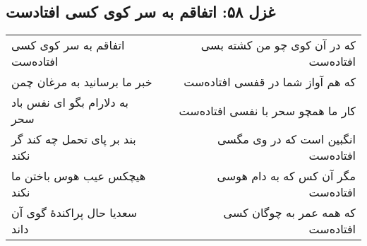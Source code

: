 \begin{center}
\section*{غزل ۵۸: اتفاقم به سر کوی کسی افتادست}
\label{sec:058}
\begin{longtable}{l p{0.5cm} r}
اتفاقم به سر کوی کسی افتاده‌ست
&&
که در آن کوی چو من کشته بسی افتاده‌ست
\\
خبر ما برسانید به مرغان چمن
&&
که هم آواز شما در قفسی افتاده‌ست
\\
به دلارام بگو ای نفس باد سحر
&&
کار ما همچو سحر با نفسی افتاده‌ست
\\
بند بر پای تحمل چه کند گر نکند
&&
انگبین است که در وی مگسی افتاده‌ست
\\
هیچکس عیب هوس باختن ما نکند
&&
مگر آن کس که به دام هوسی افتاده‌ست
\\
سعدیا حال پراکندهٔ گوی آن داند
&&
که همه عمر به چوگان کسی افتاده‌ست
\\
\end{longtable}
\end{center}
